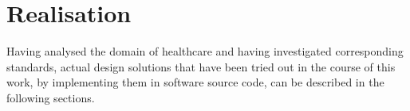 %
%
%
%
%
%
%

\section{Realisation}
\label{realisation_heading}

Having analysed the domain of healthcare and having investigated corresponding
standards, actual design solutions that have been tried out in the course of
this work, by implementing them in software source code, can be described in
the following sections.






